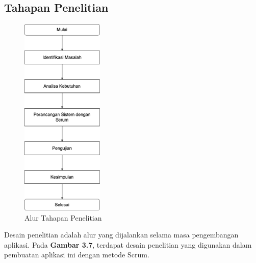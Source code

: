 \begin{spacing}{1.5}


\section{Tahapan Penelitian}

\begin{figure}[H]
	\centering
	\includegraphics[width=0.35\textwidth]{gambar/tahapan_penelitian.png}
	\caption{Alur Tahapan Penelitian}
\end{figure}

Desain penelitian adalah alur yang dijalankan selama masa pengembangan aplikasi. Pada \textbf{Gambar 3.7}, terdapat desain penelitian yang digunakan dalam pembuatan aplikasi ini dengan metode Scrum.



\end{spacing}

